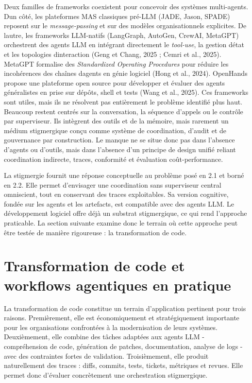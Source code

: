 Deux familles de frameworks coexistent pour concevoir des systèmes
multi-agents. D\textquotesingle un côté, les plateformes MAS classiques
pré-LLM (JADE, Jason, SPADE) reposent sur le \emph{message-passing} et
sur des modèles organisationnels explicites. De l\textquotesingle autre,
les frameworks LLM-natifs (LangGraph, AutoGen, CrewAI, MetaGPT)
orchestrent des agents LLM en intégrant directement le \emph{tool-use},
la gestion d\textquotesingle état et les topologies
d\textquotesingle interaction (Geng et Chang, 2025 ; Cemri et al.,
2025). MetaGPT formalise des \emph{Standardized Operating Procedures}
pour réduire les incohérences des chaînes d\textquotesingle agents en
génie logiciel (Hong et al., 2024). OpenHands propose une plateforme
open source pour développer et évaluer des agents généralistes en prise
sur dépôts, shell et tests (Wang et al., 2025). Ces frameworks sont utiles, mais ils ne résolvent pas entièrement le problème identifié plus haut. Beaucoup restent centrés sur la conversation, la séquence d'appels ou le contrôle par superviseur. Ils intègrent des outils et de la mémoire, mais rarement un médium stigmergique conçu comme système de coordination, d'audit et de gouvernance par construction. Le manque ne se situe donc pas dans l'absence d'agents ou d'outils, mais dans l'absence d'un principe de design unifié reliant coordination indirecte, traces, conformité et évaluation coût-performance.


La stigmergie fournit une réponse conceptuelle au problème posé en 2.1 et borné en 2.2. Elle permet d'envisager une coordination sans superviseur central omniscient, tout en conservant des traces exploitables. Sa version cognitive, fondée sur les agents et les artefacts, est compatible avec des agents LLM. Le développement logiciel offre déjà un substrat stigmergique, ce qui rend l'approche praticable. La section suivante examine donc le terrain où cette approche peut être testée de manière rigoureuse : la transformation de code.

\section{Transformation de code et workflows agentiques en pratique}\label{sec:rev-transformation-code}

La transformation de code constitue un terrain d'application pertinent pour trois raisons. Premièrement, elle est économiquement et stratégiquement importante pour les organisations confrontées à la modernisation de leurs systèmes. Deuxièmement, elle combine des tâches adaptées aux agents LLM - compréhension de code, génération de patches, documentation, analyse de logs - avec des contraintes fortes de validation. Troisièmement, elle produit naturellement des traces : diffs, commits, tests, tickets, métriques et revues. Elle permet donc d'évaluer concrètement une orchestration stigmergique.

